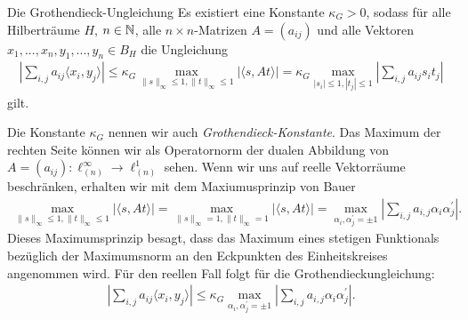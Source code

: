 \begin{genericthm}{Die Grothendieck-Ungleichung}\label{th:grothendieck_inequality}
	Es existiert eine Konstante $ \kappa_G  >0$, sodass für alle Hilberträume $ H $, $ n \in \mathbb{N} $, alle $ n \times n  $-Matrizen $ A =  (a_{i j}) $ und alle Vektoren $ x_1,...,x_n,y_1,...,y_n \in B_H $ die Ungleichung
	\begin{align}\label{eq:grothendieck_ineq_general}
		\left|
			\sum \limits_{i,j} a_{ij}  \langle x_i,y_j \rangle 
		\right|
		\leq
		\kappa_G
		\max 
		\limits_{\|s\|_{\infty} \leq 1 , \|t\|_{\infty} \leq 1 }
		\left|
		\langle 
		s, A t
		\rangle
		\right|
		=
		\kappa_G
		\max 
		\limits_{|s_i| \leq 1 , |t_j| \leq  1}
		\left|
		\sum \limits_{i,j} 
		a_{ij} s_i t_j
		\right|
	\end{align}
	gilt.
	
\end{genericthm}
Die Konstante $ \kappa_G $ nennen wir auch \textit{Grothendieck-Konstante}.
Das Maximum der rechten Seite können wir als Operatornorm der dualen Abbildung von $ A =(a_{ij}) : \ell_{(n)}^\infty \to \ell_{(n)}^1 $ sehen.
Wenn wir uns auf reelle Vektorräume beschränken, erhalten wir mit dem Maxiumusprinzip von Bauer \cite{Bauer1960}
\begin{align*}
	\max 
	\limits_{\|s\|_{\infty} \leq 1 , \|t\|_{\infty} \leq 1 }
	\left|
	\langle 
	s, A t
	\rangle
	\right|
	=
\max 
\limits_{\|s\|_{\infty} = 1 , \|t\|_{\infty}=  1 }
	\left|
	\langle 
	s, A t
	\rangle
	\right|
	=
	\max 
	\limits_{\alpha_i, \alpha^\prime_j = \pm 1 }
	\left|
	\sum \limits_{i,j} 
	a_{i,j} \alpha_i \alpha^\prime_j
	\right|.
\end{align*}
Dieses Maximumsprinzip besagt, dass das Maximum eines stetigen Funktionals bezüglich der Maximumsnorm an den Eckpunkten des Einheitskreises angenommen wird.
Für den reellen Fall folgt für die Grothendieckungleichung:
\begin{align}\label{eq:grothendieck_ineq_real}
	\left|
	\sum \limits_{i,j} a_{ij}  \langle x_i,y_j \rangle 
	\right|
	\leq
	\kappa_G
	\max 
	\limits_{\alpha_i, \alpha^\prime_j = \pm 1 }
	\left|
	\sum \limits_{i,j} 
	a_{i,j} \alpha_i \alpha^\prime_j
	\right|.
\end{align} 

